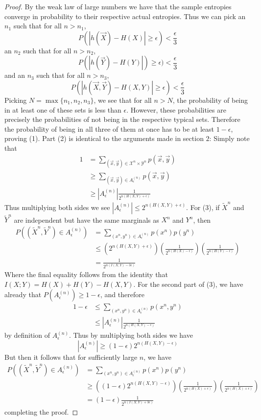 \begin{proof}
	By the weak law of large numbers we have that the sample entropies converge in probability to their respective actual entropies. Thus we can pick an $n_1$ such that for all $n > n_1$, 
	\[ P(|h(\vec{X})-H(X)| \geq \epsilon) < \frac{\epsilon}{3}\]
an $n_2$ such that for all $n > n_2$,
\[ P(|h(\vec{Y})-H(Y)|) \geq \epsilon) < \frac{\epsilon}{3} \]
and an $n_3$ such that for all $n > n_3$,
 \[  P(|h(\vec{X},\vec{Y})-H(X,Y)| \geq \epsilon) < \frac{\epsilon}{3}\]
 Picking $N = \max\{n_1,n_2,n_3\}$, we see that for all $n > N$, the probability of being in at least one of these sets is less than $\epsilon$. However, these probabilities are precisely the probabilities of not being in the respective typical sets. Therefore the probability of being in all three of them at once has to be at least $1-\epsilon$, proving (1). Part (2) is identical to the arguments made in section $2$: Simply note that 
 \begin{align}
 	1 &= \sum_{(\vec{x},\vec{y}) \in \mathcal{X}^n \times \mathcal{Y}^n} p(\vec{x},\vec{y}) \\
 	&\geq \sum_{(\vec{x},\vec{y}) \in A_{\epsilon}^{(n)}} p(\vec{x},\vec{y}) \\
 	&\geq |A_{\epsilon}^{(n)}|\frac{1}{2^{n(H(X,Y)+\epsilon)}}
 \end{align}
 Thus multiplying both sides we see $|A_{\epsilon}^{(n)}| \leq 2^{n(H(X,Y)+\epsilon)}$. For (3), if $\tilde{X}^n$ and $\tilde{Y}^n$ are independent but have the same marginals as $X^n$ and $Y^n$, then 
 \begin{align}
 	P((\tilde{X}^n,\tilde{Y}^n) \in A_{\epsilon}^{(n)}) &= \sum_{(x^n,y^n) \in A_{\epsilon}^{(n)}} p(x^n)p(y^n)  \\
 	&\leq \left( 2^{n(H(X,Y)+\epsilon)}\right)\left( \frac{1}{2^{n(H(X)-\epsilon)}} \right) \left( \frac{1}{2^{n(H(Y)-\epsilon)}} \right) \\
 	&= \frac{1}{2^{n(I(X;Y)-3\epsilon)}}
 \end{align}
 Where the final equality follows from the identity that $I(X;Y) = H(X)+H(Y)-H(X,Y)$. For the second part of (3), we have already that $P(A_{\epsilon}^{(n)}) \geq 1-\epsilon$, and therefore 
 \begin{align}
 	1-\epsilon &\leq \sum_{(x^n,y^n) \in A_{\epsilon}^{(n)}} p(x^n,y^n) \\
 			&\leq |A_{\epsilon}^{(n)}|\frac{1}{2^{n(H(X,Y)-\epsilon)}} 
 \end{align}
 by definition of $A_{\epsilon}^{(n)}$. Thus by multiplying both sides we have 
 \[ |A_{\epsilon}^{(n)}| \geq (1-\epsilon)2^{n(H(X,Y)-\epsilon)} \]
 But then it follows that for sufficiently large $n$, we have 
 \begin{align}
 	P((\tilde{X}^n,\tilde{Y}^n) \in A_{\epsilon}^{(n)}) &= \sum_{(x^n,y^n) \in A_{\epsilon}^{(n)}}p(x^n)p(y^n) \\ &\geq \left((1-\epsilon)2^{n(H(X,Y)-\epsilon)}\right) \left( \frac{1}{2^{n(H(X)+\epsilon)}} \right)\left( \frac{1}{2^{n(H(X)+\epsilon)}} \right) \\
 	&= (1-\epsilon)\frac{1}{2^{n(I(X;Y)+3\epsilon)}}
 \end{align}
 completing the proof. 
\end{proof}
